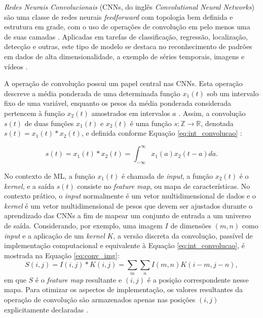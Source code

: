 \emph{Redes Neurais Convolucionais} (CNNs, do inglês \emph{Convolutional Neural Networks}) são uma classe de redes neurais \emph{feedforward} com topologia bem definida e estrutura em grade, com o uso de operações de convolução em pelo menos uma de suas camadas \cite{goodfellow2016deep}. Aplicadas em tarefas de classificação, regressão, localização, detecção e outras, este tipo de modelo se destaca no reconhecimento de padrões em dados de alta dimensionalidade, a exemplo de séries temporais, imagens e vídeos \cite{Khan:Livro}.

A operação de convolução possui um papel central nas CNNs. Esta operação descreve a média ponderada de uma determinada função $x_1(t)$ sob um intervalo fixo de uma variável, enquanto os pesos da média ponderada considerada pertencem à função $x_2(t)$ amostrados em intervalos $a$ \cite{bracewell1986fourier}. Assim, a convolução $s(t)$ de duas funções $x_1(t)$ e $x_2(t)$ é uma função $s: \mathds{Z} \rightarrow \mathds{R}$, denotada $s(t) = x_1(t) * x_2(t)$, e definida conforme Equação \ref{eq:int_convolucao} \cite{lathi2006sinais}:

\begin{equation}\label{eq:int_convolucao}
s(t) = x_1(t) * x_2(t) = \int_{-\infty}^{\infty} x_1(a) x_2(t-a)da.
\end{equation}

No contexto de ML, a função $x_1(t)$ é chamada de \emph{input}, a função $x_2(t)$ é o \emph{kernel}, e a saída $s(t)$ consiste no \emph{feature map}, ou mapa de características. No contexto prático, o \emph{input} normalmente é um vetor multidimensional de dados e o \emph{kernel} é um vetor multidimensional de pesos que devem ser ajustados durante o aprendizado das CNNs a fim de mapear um conjunto de entrada a um universo de saída. Considerando, por exemplo, uma imagem $I$ de dimensões $(m,n)$ como \emph{input} e a aplicação de um \emph{kernel} $K$, a versão discreta da convolução, passível de implementação computacional e equivalente à Equação \ref{eq:int_convolucao}, é mostrada na Equação \ref{eq:conv_img}:
\begin{equation}
 S(i,j) = I(i,j)*K(i,j) = \sum_{m}\sum_{n}I(m,n)K(i-m,j-n),\label{eq:conv_img}
\end{equation}
em que $S$ é o \emph{feature map} resultante e $(i,j)$ é a posição correspondente nesse mapa. Para otimizar os aspectos de implementação, os valores resultantes da operação de convolução são armazenados apenas nas posições $(i,j)$ explicitamente declaradas \cite{goodfellow2016deep}.

